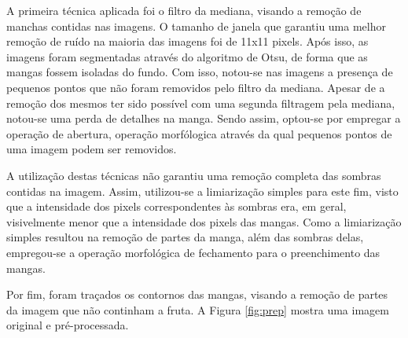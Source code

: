 A primeira técnica aplicada foi o filtro da mediana, visando a remoção de manchas contidas nas imagens. O tamanho de janela que garantiu uma melhor remoção de ruído na maioria das imagens foi de 11x11 pixels. Após isso, as imagens foram segmentadas através do algoritmo de Otsu, de forma que as mangas fossem isoladas do fundo. Com isso, notou-se nas imagens a presença de pequenos pontos que não foram removidos pelo filtro da mediana. Apesar de a remoção dos mesmos ter sido possível com uma segunda filtragem pela mediana, notou-se uma perda de detalhes na manga. Sendo assim, optou-se por empregar a operação de abertura, operação morfólogica através da qual pequenos pontos de uma imagem podem ser removidos. 

A utilização destas técnicas não garantiu uma remoção completa das sombras contidas na imagem. Assim, utilizou-se a limiarização simples para este fim, visto que a intensidade dos pixels correspondentes às sombras era, em geral, visivelmente menor que a intensidade dos pixels das mangas. Como a limiarização simples resultou na remoção de partes da manga, além das sombras delas, empregou-se a operação morfológica de fechamento para o preenchimento das mangas.

Por fim, foram traçados os contornos das mangas, visando a remoção de partes da imagem que não continham a fruta. A Figura \ref{fig:prep} mostra uma imagem original e pré-processada.

